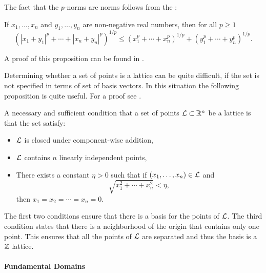 The fact that the $p$-norms are norms follows from the  \cite[pages 115--117]{Minkowski96}:

\begin{proposition}[{\Minkowski}]
If $x_1, \ldots, x_n$ and $y_1, \ldots, y_n$ are non-nega\-tive real
numbers, then for all $p \ge 1$
\[
\left(|x_1 + y_1|^p + \cdots + |x_n + y_n|^p\right)^{1/p} \le 
\left(x_1^p + \cdots + x_n^p\right)^{1/p} + 
\left(y_1^p + \cdots + y_n^p\right)^{1/p}.
\]
\end{proposition}

\noindent
A proof of this proposition can be found in
\cite{Hardy:Inequalities}.

Determining whether a set of points is a lattice can be quite
difficult, if the set is not specified in terms of set of basis
vectors.  In this situation the following proposition is quite useful.
For a proof see {\Cassels} \cite[page 78]{Cassels:Geometry}.

\begin{proposition} \label{Lattice:Condition:Prop}
A necessary and sufficient condition that a set of points ${\cal L} \subset
\mathbb{R}^n$ be a lattice is that the set satisfy:
\begin{itemize}
\item ${\cal L}$ is closed under component-wise addition,
\item ${\cal L}$ contains $n$ linearly independent points,
\item There exists a constant $\eta> 0$ such that if $(x_1, \ldots,
x_n) \in {\cal L}$ and
\[
\sqrt{x_1^2 + \cdots + x_n^2} < \eta,
\]
then $x_1 = x_2 = \cdots = x_n = 0$.
\end{itemize}
\end{proposition}

The first two conditions ensure that there is a basis for the points
of ${\cal L}$.  The third condition states that there is a neighborhood of
the origin that contains only one point.  This ensures that all the
points of ${\cal L}$ are separated and thus the basis is a $\mathbb{Z}$ lattice.

\paragraph{Fundamental Domains}

